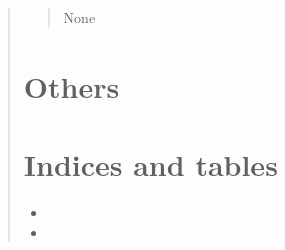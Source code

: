 \documentclass[letterpaper,10pt,english]{sphinxmanual}
\begin{document}
\begin{quote}
\begin{savenotes}
\begin{fulllineitems}
\begin{quote}
\begin{description}
\sphinxAtStartPar
None

\end{description}\end{quote}

\end{fulllineitems}\end{savenotes}


\sphinxstepscope


\chapter{Others}
\label{\detokenize{Others:others}}\label{\detokenize{Others::doc}}

\chapter{Indices and tables}
\label{\detokenize{index:indices-and-tables}}\begin{itemize}
\item {} 
\sphinxAtStartPar
{}

\item {} 
\sphinxAtStartPar
{}

\end{itemize}



\end{quote}
\end{document}
